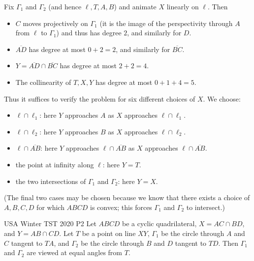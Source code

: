 \vspace{1em}
\begin{solution} Fix $\Gamma_1$ and $\Gamma_2$
    (and hence $\ell, T, A, B$) and animate $X$ linearly on $\ell$. Then

    \begin{itemize} 
        \item $C$ moves projectively on $\Gamma_1$ (it is the
            image of the perspectivity through $A$ from $\ell$ to $\Gamma_1$) and
            thus has degree $2$, and similarly for $D$.  
        \item $\overline{AD}$ has
            degree at most $0+2=2$, and similarly for $\overline{BC}$.  
        \item $Y=\overline{AD}\cap\overline{BC}$ has degree at most $2+2=4.$ 
        \item The collinearity of $T,X,Y$ has degree at most $0+1+4=5.$ 
    \end{itemize}

    Thus it suffices to verify the problem for six different choices of $X$.
    We choose:

    \begin{itemize} 
        \item $\ell\cap \ell_1$: here $Y$ approaches $A$ as $X$
            approaches $\ell\cap \ell_1$.  
        \item $\ell\cap\ell_2$: here $Y$
            approaches $B$ as $X$ approaches $\ell\cap \ell_2$.  
        \item $\ell\cap \overline{AB}$: here $Y$ approaches $\ell\cap \overline{AB}$ as $X$
            approaches $\ell\cap \overline{AB}$.  
        \item the point at infinity along $\ell$: here $Y=T$.  
        \item the two intersections of $\Gamma_1$ and $\Gamma_2$: here $Y=X$.  
    \end{itemize}

    (The final two cases may be chosen because we know that there exists a
    choice of $A,B,C,D$ for which $ABCD$ is convex; this forces $\Gamma_1$ and
    $\Gamma_2$ to intersect.) 
\end{solution}


{USA Winter TST 2020 P2}{
    Let $ABCD$ be a cyclic quadrilateral, $X=AC\cap BD$, and
    $Y=AB\cap CD$. Let $T$ be a point on line $XY$, $\Gamma_1$ be the circle
    through $A$ and $C$ tangent to $TA$, and $\Gamma_2$ be the circle through $B$
    and $D$ tangent to $TD$. Then $\Gamma_1$ and $\Gamma_2$ are viewed at equal
    angles from $T$.
}

